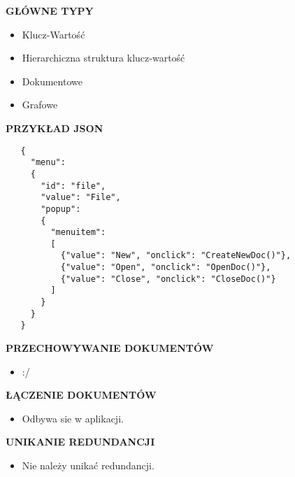 \documentclass[a5paper,6pt]{article}
\begin{document}
    \vskip 0.5cm

    \textbf{GŁÓWNE TYPY}
    \begin{itemize}
        \item Klucz-Wartość
        \item Hierarchiczna struktura klucz-wartość
        \item Dokumentowe
        \item Grafowe
    \end{itemize}

\pagebreak

    \textbf{PRZYKŁAD JSON}
    \begin{verbatim}
   {
     "menu":
     {
       "id": "file",
       "value": "File",
       "popup":
       {
         "menuitem":
         [
           {"value": "New", "onclick": "CreateNewDoc()"},
           {"value": "Open", "onclick": "OpenDoc()"},
           {"value": "Close", "onclick": "CloseDoc()"}
         ]
       }
     }
   }
    \end{verbatim}

    \textbf{PRZECHOWYWANIE DOKUMENTÓW}
    \begin{itemize}
        \item :/
    \end{itemize}

    \textbf{ŁĄCZENIE DOKUMENTÓW}
    \begin{itemize}
        \item Odbywa sie w aplikacji.
    \end{itemize}

    \textbf{UNIKANIE REDUNDANCJI}
    \begin{itemize}
        \item Nie należy unikać redundancji.
    \end{itemize}


    \newpage
    ~
\end{document}
